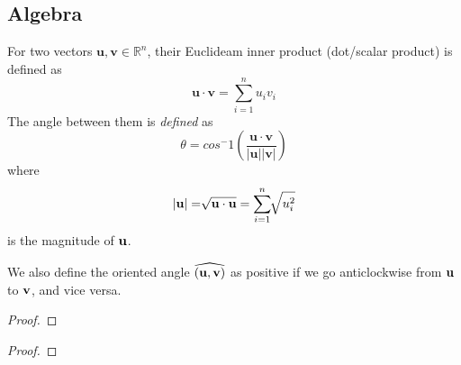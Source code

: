 \documentclass[11pt]{article}
\begin{document}
\subsection{Algebra}
\begin{definition}
  For two vectors \(\mathbf{u}, \mathbf{v} \in \mathbb{R}^n\), their Euclideam inner product (dot/scalar product) is defined as
  \begin{equation*}
    \mathbf{u} \cdot \mathbf{v} = \sum_{i=1}^{n} u_i v_i
  \end{equation*}
  The angle between them is \textit{defined} as 
  \begin{equation*}
    \theta = cos^-1(\frac{\mathbf{u} \cdot \mathbf{v}}{|\mathbf{u}||\mathbf{v}|})
  \end{equation*}
  where \[|\bf{u}| = \sqrt[]{\bf{u} \cdot \bf{u}} = \sum_{i=1}^{n} \sqrt[]{u_{i}^{2}}\] is the magnitude of \(\bf{u}\).

  \noindent We also define the oriented angle \(\widehat{(\bf{u},\bf{v})}\) as positive if we go anticlockwise from \(\bf{u}\) to \(\bf{v}\), and vice versa.
\end{definition}

\begin{proposition}
  
\end{proposition}
\begin{proof}
\end{proof}

\begin{proposition}
  
\end{proposition}
\begin{proof}
  
\end{proof}

\begin{proposition}[Projection]
  
\end{proposition}

\begin{definition}
  
\end{definition}

\begin{definition}
  
\end{definition}
\end{document}
